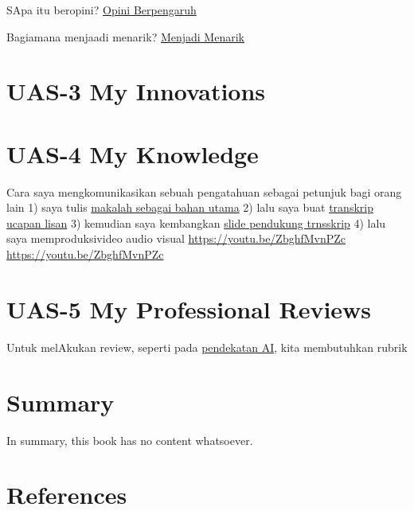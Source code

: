 \documentclass[
  letterpaper,
  DIV=11,
  numbers=noendperiod]{scrreprt}
\begin{document}
SApa itu beropini? \href{BM\%20Opini.mp4}{Opini Berpengaruh}

Bagiamana menjaadi menarik? \href{./Interesting.mp4}{Menjadi Menarik}


\chapter{UAS-3 My Innovations}\label{uas-3-my-innovations}


\chapter{UAS-4 My Knowledge}\label{uas-4-my-knowledge}

Cara saya mengkomunikasikan sebuah pengatahuan sebagai petunjuk bagi
orang lain 1) saya tulis
\href{Rekomendasi\%20Presentasi\%20Efektif(Contoh\%20Makalah).pdf}{makalah
sebagai bahan utama} 2) lalu saya buat
\href{Contoh\%20Transkrip\%20Presentasi.pdf}{transkrip ucapan lisan} 3)
kemudian saya kembangkan
\href{Rekomendasi\%20Presentasi\%20(Contoh\%20Slides).pdf}{slide
pendukung trnsskrip} 4) lalu saya memproduksivideo audio visual
\url{https://youtu.be/ZbghfMvnPZc} \url{https://youtu.be/ZbghfMvnPZc}


\chapter{UAS-5 My Professional
Reviews}\label{uas-5-my-professional-reviews}

Untuk melAkukan review, seperti pada
\href{../My_Personal_Reviews/Doc.5.Mengevaluasi-Esai-Berdasarkan-Rubrik.pdf}{pendekatan
AI}, kita membutuhkan rubrik


\chapter{Summary}\label{summary}

In summary, this book has no content whatsoever.


\chapter*{References}\label{references}


\label{refs}
\end{document}
